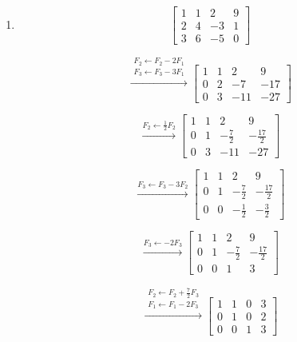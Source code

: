 \documentclass[12pt,letterpaper]{article}
\begin{document}
\begin{enumerate}
\[
\xrightarrow{F_1 \leftarrow F_1 - 2F_2}
\left[
\begin{array}{ccc|c}
1 & 0 & 0 & 4 \\
0 & 1 & 0 & -2 \\
0 & 0 & 1 & 3
\end{array}
\right]
\]

Solución:

\[
x = 4, \quad y = -2, \quad z = 3
\]

\item 

\[
\left[
\begin{array}{ccc|c}
1 & 1 & 2 & 9 \\
2 & 4 & -3 & 1 \\
3 & 6 & -5 & 0
\end{array}
\right]
\]

\[
\xrightarrow{\substack{F_2 \leftarrow F_2 - 2F_1\\ F_3 \leftarrow F_3 - 3F_1}}
\left[
\begin{array}{ccc|c}
1 & 1 & 2 & 9 \\
0 & 2 & -7 & -17 \\
0 & 3 & -11 & -27
\end{array}
\right]
\]

\[
\xrightarrow{F_2 \leftarrow \frac12 F_2}
\left[
\begin{array}{ccc|c}
1 & 1 & 2 & 9 \\
0 & 1 & -\frac{7}{2} & -\frac{17}{2} \\
0 & 3 & -11 & -27
\end{array}
\right]
\]

\[
\xrightarrow{F_3 \leftarrow F_3 - 3F_2}
\left[
\begin{array}{ccc|c}
1 & 1 & 2 & 9 \\
0 & 1 & -\frac{7}{2} & -\frac{17}{2} \\
0 & 0 & -\frac12 & -\frac32
\end{array}
\right]
\]

\[
\xrightarrow{F_3 \leftarrow -2F_3}
\left[
\begin{array}{ccc|c}
1 & 1 & 2 & 9 \\
0 & 1 & -\frac{7}{2} & -\frac{17}{2} \\
0 & 0 & 1 & 3
\end{array}
\right]
\]

\[
\xrightarrow{\substack{F_2 \leftarrow F_2 + \frac{7}{2}F_3\\ F_1 \leftarrow F_1 - 2F_3}}
\left[
\begin{array}{ccc|c}
1 & 1 & 0 & 3 \\
0 & 1 & 0 & 2 \\
0 & 0 & 1 & 3
\end{array}
\right]
\]


\end{enumerate}
\end{document}
